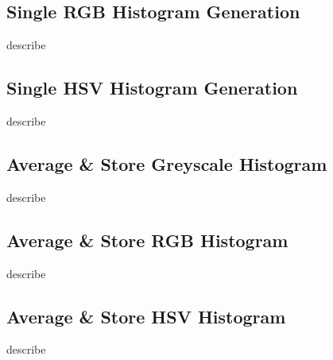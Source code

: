 
\subsection{Single RGB Histogram Generation}
\label{sec:code-single_rgb_histogram_generation}

describe




\subsection{Single HSV Histogram Generation}
\label{sec:code-average_and}

describe




\subsection{Average \& Store Greyscale Histogram}
\label{sec:code-generate_and_store_average_grey_histogram}

describe




\subsection{Average \& Store RGB Histogram}
\label{sec:code-generate_and_store_average_rgb_histogram}

describe




\subsection{Average \& Store HSV Histogram}
\label{sec:code-generate_and_store_average_hsv_histogram}

describe

